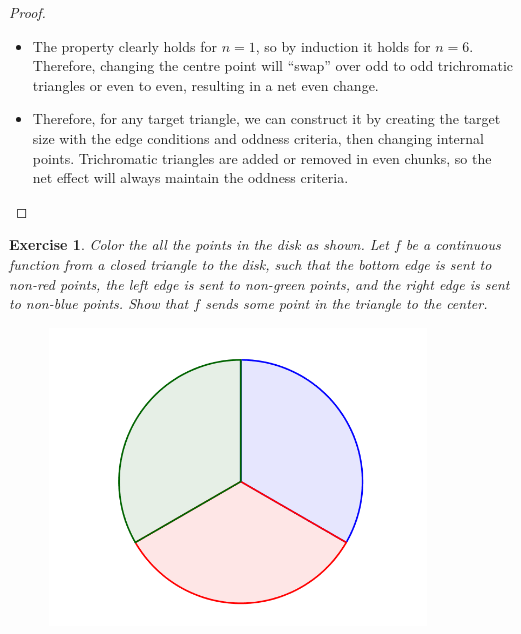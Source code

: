 \documentclass[12pt]{article}
\newtheorem{exercise}{Exercise}
\begin{document}
\begin{proof}
\begin{itemize}
        \item The property clearly holds for $n=1$, so by induction it holds for $n=6$. Therefore, changing the centre point will ``swap'' over odd to odd trichromatic triangles or even to even, resulting in a net even change.
        \item Therefore, for any target triangle, we can construct it by creating the target size with the edge conditions and oddness criteria, then changing internal points. Trichromatic triangles are added or removed in even chunks, so the net effect will always maintain the oddness criteria.
    \end{itemize}
\end{proof}

\begin{exercise}
    Color the all the points in the disk as shown. Let $f$ be a continuous function from a closed triangle to the disk, such that the bottom edge is sent to non-red points, the left edge is sent to non-green points, and the right edge is sent to non-blue points. Show that $f$ sends some point in the triangle to the center.
\end{exercise}

\begin{figure}[h]
    \centering
    \includegraphics[width=10cm]{fixed_points_3.png}
    \label{fig:my_label}
\end{figure}
\end{document}
